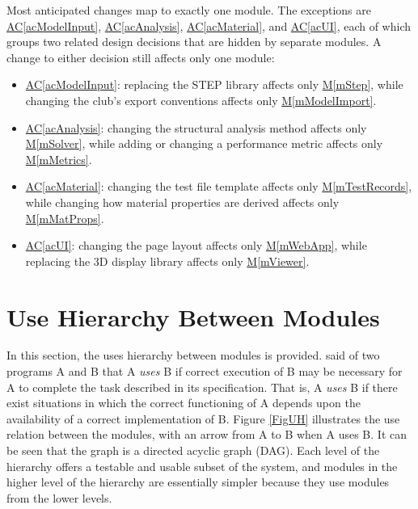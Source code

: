 \documentclass[12pt, titlepage]{article}
\newcommand{\acref}[1]{\hyperref[#1]{AC\ref*{#1}}}
\newcommand{\mref}[1]{\hyperref[#1:dec]{M\ref*{#1}}}
\begin{document}
Most anticipated changes map to exactly one module. The exceptions are \acref{acModelInput}, \acref{acAnalysis}, \acref{acMaterial}, and \acref{acUI}, each of which groups two related design decisions that are hidden by separate modules. A change to either decision still affects only one module:
\begin{itemize}
\item \acref{acModelInput}: replacing the STEP library affects only \mref{mStep}, while changing the club's export conventions affects only \mref{mModelImport}.
\item \acref{acAnalysis}: changing the structural analysis method affects only \mref{mSolver}, while adding or changing a performance metric affects only \mref{mMetrics}.
\item \acref{acMaterial}: changing the test file template affects only \mref{mTestRecords}, while changing how material properties are derived affects only \mref{mMatProps}.
\item \acref{acUI}: changing the page layout affects only \mref{mWebApp}, while replacing the 3D display library affects only \mref{mViewer}.
\end{itemize}

\section{Use Hierarchy Between Modules} \label{SecUse}

In this section, the uses hierarchy between modules is provided. \citet{Parnas1978} said of two programs A and B that A {\em uses} B if correct execution of B may be necessary for A to complete the task described in its specification. That is, A {\em uses} B if there exist situations in which the correct functioning of A depends upon the availability of a correct implementation of B. Figure \ref{FigUH} illustrates the use relation between the modules, with an arrow from A to B when A uses B. It can be seen that the graph is a directed acyclic graph (DAG). Each level of the hierarchy offers a testable and usable subset of the system, and modules in the higher level of the hierarchy are essentially simpler because they use modules from the lower levels.
\end{document}
